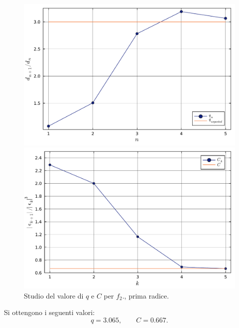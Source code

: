 \documentclass[letterpaper, 12pt]{article}
\begin{document}
\begin{figure}[!ht]
    \centering
    \begin{minipage}[b]{0.47\textwidth}
        \includegraphics[width=\textwidth]{3322_q1.pdf}
    \end{minipage}
    \hspace{0.5cm}
    \begin{minipage}[b]{0.47\textwidth}
        \includegraphics[width=\textwidth]{3322_C1.pdf}
    \end{minipage}
    \caption{Studio del valore di $q$ e $C$ per $f_2$., prima radice.}
    \label{fig:es3_3_2_3}
\end{figure}

Si ottengono i seguenti valori:
\begin{equation}
    q = 3.065,
    \qquad
    C = 0.667.
\end{equation}
\end{document}
